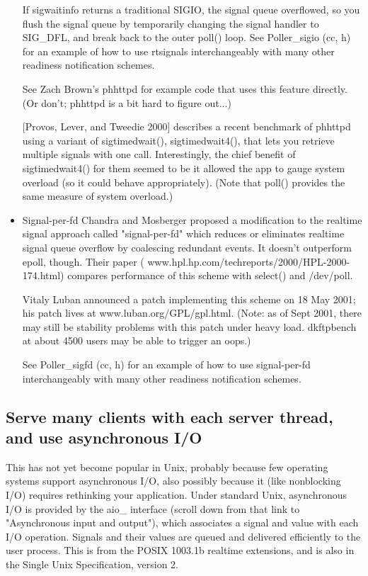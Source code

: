\documentclass[twoside, xetex]{report}
\begin{document}
\begin{itemize}
If sigwaitinfo returns a traditional SIGIO, the signal queue overflowed, so you flush the signal queue by temporarily changing the signal handler to SIG\_DFL, and break back to the outer poll() loop. 
See Poller\_sigio (cc, h) for an example of how to use rtsignals interchangeably with many other readiness notification schemes.

See Zach Brown's phhttpd for example code that uses this feature directly. (Or don't; phhttpd is a bit hard to figure out...)

[Provos, Lever, and Tweedie 2000] describes a recent benchmark of phhttpd using a variant of sigtimedwait(), sigtimedwait4(), that lets you retrieve multiple signals with one call. Interestingly, the chief benefit of sigtimedwait4() for them seemed to be it allowed the app to gauge system overload (so it could behave appropriately). (Note that poll() provides the same measure of system overload.)

\item Signal-per-fd
Chandra and Mosberger proposed a modification to the realtime signal approach called "signal-per-fd" which reduces or eliminates realtime signal queue overflow by coalescing redundant events. It doesn't outperform epoll, though. Their paper ( www.hpl.hp.com/techreports/2000/HPL-2000-174.html) compares performance of this scheme with select() and /dev/poll.

Vitaly Luban announced a patch implementing this scheme on 18 May 2001; his patch lives at www.luban.org/GPL/gpl.html. (Note: as of Sept 2001, there may still be stability problems with this patch under heavy load. dkftpbench at about 4500 users may be able to trigger an oops.)

See Poller\_sigfd (cc, h) for an example of how to use signal-per-fd interchangeably with many other readiness notification schemes.

\end{itemize}
\subsection*{Serve many clients with each server thread, and use asynchronous I/O}

This has not yet become popular in Unix, probably because few operating systems support asynchronous I/O, also possibly because it (like nonblocking I/O) requires rethinking your application. Under standard Unix, asynchronous I/O is provided by the aio\_ interface (scroll down from that link to "Asynchronous input and output"), which associates a signal and value with each I/O operation. Signals and their values are queued and delivered efficiently to the user process. This is from the POSIX 1003.1b realtime extensions, and is also in the Single Unix Specification, version 2.
\end{document}
